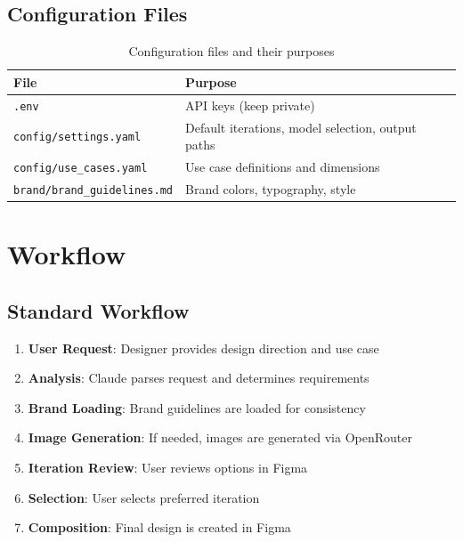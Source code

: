\documentclass[11pt,a4paper]{article}
\begin{document}
\subsection{Configuration Files}

\begin{table}[h]
\centering
\begin{tabular}{@{}lp{8cm}@{}}
\toprule
\textbf{File} & \textbf{Purpose} \\
\midrule
\texttt{.env} & API keys (keep private) \\
\texttt{config/settings.yaml} & Default iterations, model selection, output paths \\
\texttt{config/use\_cases.yaml} & Use case definitions and dimensions \\
\texttt{brand/brand\_guidelines.md} & Brand colors, typography, style \\
\bottomrule
\end{tabular}
\caption{Configuration files and their purposes}
\end{table}

\section{Workflow}

\subsection{Standard Workflow}

\begin{enumerate}
    \item \textbf{User Request}: Designer provides design direction and use case
    \item \textbf{Analysis}: Claude parses request and determines requirements
    \item \textbf{Brand Loading}: Brand guidelines are loaded for consistency
    \item \textbf{Image Generation}: If needed, images are generated via OpenRouter
    \item \textbf{Iteration Review}: User reviews options in Figma
    \item \textbf{Selection}: User selects preferred iteration
    \item \textbf{Composition}: Final design is created in Figma
\end{enumerate}
\end{document}
